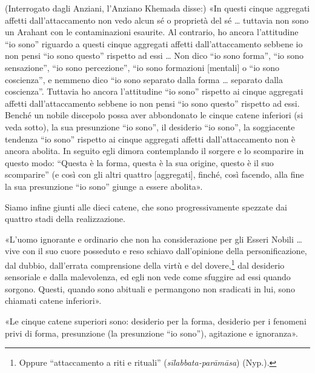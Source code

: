 
(Interrogato dagli Anziani, l’Anziano Khemada disse:) «In questi cinque
aggregati affetti dall’attaccamento non vedo alcun sé o proprietà del sé …
tuttavia non sono un Arahant con le contaminazioni esaurite. Al contrario, ho
ancora l’attitudine “io sono” riguardo a questi cinque aggregati affetti
dall’attaccamento sebbene io non pensi “io sono questo” rispetto ad essi … Non
dico “io sono forma”, “io sono sensazione”, “io sono percezione”, “io sono
formazioni [mentali] o “io sono coscienza”, e nemmeno dico “io sono separato
dalla forma … separato dalla coscienza”. Tuttavia ho ancora l’attitudine “io
sono” rispetto ai cinque aggregati affetti dall’attaccamento sebbene io non
pensi “io sono questo” rispetto ad essi. Benché un nobile discepolo possa aver
abbondonato le cinque catene inferiori (si veda sotto), la sua presunzione “io
sono”, il desiderio “io sono”, la soggiacente tendenza “io sono” rispetto ai
cinque aggregati affetti dall’attaccamento non è ancora abolita. In seguito egli
dimora contemplando il sorgere e lo scomparire in questo modo: “Questa è la
forma, questa è la sua origine, questo è il suo scomparire” (e così con gli
altri quattro [aggregati], finché, così facendo, alla fine la sua presunzione
“io sono” giunge a essere abolita».


 Siamo infine giunti alle dieci catene, che sono
progressivamente spezzate dai quattro stadi della realizzazione.

 «L’uomo ignorante e ordinario che non ha considerazione per
gli Esseri Nobili … vive con il suo cuore posseduto e reso schiavo dall’opinione
della personificazione, dal dubbio, dall’errata comprensione della virtù e del
dovere,\footnote{Oppure “attaccamento a riti e rituali”
  (\emph{sīlabbata-parāmāsa}) (Nyp.).} dal desiderio sensoriale e dalla
malevolenza, ed egli non vede come sfuggire ad essi quando sorgono. Questi,
quando sono abituali e permangono non sradicati in lui, sono chiamati catene
inferiori».


«Le cinque catene superiori sono: desiderio per la forma, desiderio per i
fenomeni privi di forma, presunzione (la presunzione “io sono”), agitazione e
ignoranza».


